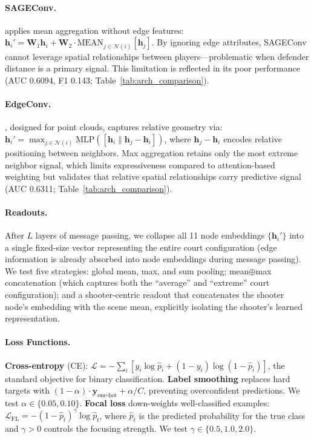 \documentclass{article}
\begin{document}
\paragraph{SAGEConv.}
\hypertarget{app:sageconv}{}
\citep{hamilton2017sage} applies mean aggregation without edge features:
$\mathbf{h}_i' = \mathbf{W}_1\mathbf{h}_i + \mathbf{W}_2 \cdot \text{MEAN}_{j \in \mathcal{N}(i)}[\mathbf{h}_j]$.
By ignoring edge attributes, SAGEConv cannot leverage spatial relationships between players---problematic when defender distance is a primary signal. This limitation is reflected in its poor performance (AUC 0.6094, F1 0.143; Table~\ref{tab:arch_comparison}).

\paragraph{EdgeConv.}
\hypertarget{app:edgeconv}{}
\citep{wang2019edgeconv}, designed for point clouds, captures relative geometry via:
$\mathbf{h}_i' = \max_{j \in \mathcal{N}(i)} \text{MLP}([\mathbf{h}_i \| \mathbf{h}_j - \mathbf{h}_i])$,
where $\mathbf{h}_j - \mathbf{h}_i$ encodes relative positioning between neighbors. Max aggregation retains only the most extreme neighbor signal, which limits expressiveness compared to attention-based weighting but validates that relative spatial relationships carry predictive signal (AUC 0.6311; Table~\ref{tab:arch_comparison}).

\paragraph{Readouts.}
\hypertarget{app:readouts}{}
After $L$ layers of message passing, we collapse all 11 node embeddings $\{\mathbf{h}_i'\}$ into a single fixed-size vector representing the entire court configuration (edge information is already absorbed into node embeddings during message passing). We test five strategies: global mean, max, and sum pooling; mean$\oplus$max concatenation (which captures both the ``average'' and ``extreme'' court configuration); and a shooter-centric readout that concatenates the shooter node's embedding with the scene mean, explicitly isolating the shooter's learned representation.

\paragraph{Loss Functions.}
\hypertarget{app:losses}{}
\textbf{Cross-entropy} (CE): $\mathcal{L} = -\sum_i [y_i \log \hat{p}_i + (1\!-\!y_i)\log(1\!-\!\hat{p}_i)]$, the standard objective for binary classification.
\textbf{Label smoothing} replaces hard targets with $(1\!-\!\alpha)\cdot\mathbf{y}_{\text{one-hot}} + \alpha/C$, preventing overconfident predictions. We test $\alpha \in \{0.05, 0.10\}$.
\textbf{Focal loss} \citep{lin2017focal} down-weights well-classified examples: $\mathcal{L}_{\text{FL}} = -(1-\hat{p}_t)^\gamma \log \hat{p}_t$, where $\hat{p}_t$ is the predicted probability for the true class and $\gamma > 0$ controls the focusing strength. We test $\gamma \in \{0.5, 1.0, 2.0\}$.
\end{document}
